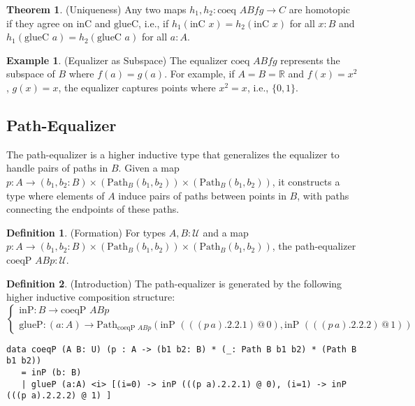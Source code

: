 \documentclass{article}
\theoremstyle{definition}
\newtheorem{theorem}{Theorem}
\newtheorem{definition}{Definition}
\newtheorem{example}{Example}
\begin{document}
\begin{theorem} (Uniqueness)
Any two maps $h_1, h_2 : \text{coeq } A B f g \to C$ are homotopic if they agree on $\text{inC}$ and $\text{glueC}$, i.e., if $h_1(\text{inC } x) = h_2(\text{inC } x)$ for all $x : B$ and $h_1(\text{glueC } a) = h_2(\text{glueC } a)$ for all $a : A$.
\end{theorem}

\begin{example} (Equalizer as Subspace)
The equalizer $\text{coeq } A B f g$ represents the subspace of $B$ where $f(a) = g(a)$. For example, if $A = B = \mathbb{R}$ and $f(x) = x^2$, $g(x) = x$, the equalizer captures points where $x^2 = x$, i.e., $\{0, 1\}$.
\end{example}

\subsection{Path-Equalizer}
The path-equalizer is a higher inductive type that generalizes the equalizer to handle pairs of paths in $B$. Given a map $p : A \to (b_1, b_2 : B) \times (\text{Path}_B (b_1, b_2)) \times (\text{Path}_B (b_1, b_2))$, it constructs a type where elements of $A$ induce pairs of paths between points in $B$, with paths connecting the endpoints of these paths.

\begin{definition} (Formation)
For types $A, B : \mathcal{U}$ and a map $p : A \to (b_1, b_2 : B) \times (\text{Path}_B (b_1, b_2)) \times (\text{Path}_B (b_1, b_2))$, the path-equalizer $\text{coeqP } A B p : \mathcal{U}$.
\end{definition}

\begin{definition} (Introduction)
The path-equalizer is generated by the following higher inductive composition structure:
\[
\begin{cases}
\text{inP} : B \to \text{coeqP } A B p \\
\text{glueP} : (a : A) \to \text{Path}_{\text{coeqP } A B p} (\text{inP } (((p \, a).2.2.1) \, @ \, 0), \text{inP } (((p \, a).2.2.2) \, @ \, 1))
\end{cases}
\]
\begin{lstlisting}
data coeqP (A B: U) (p : A -> (b1 b2: B) * (_: Path B b1 b2) * (Path B b1 b2))
   = inP (b: B)
   | glueP (a:A) <i> [(i=0) -> inP (((p a).2.2.1) @ 0), (i=1) -> inP (((p a).2.2.2) @ 1) ]
\end{lstlisting}
\end{definition}
\end{document}
